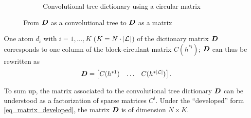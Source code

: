 \begin{figure}[!ht]
\begin{subfigure}[b]{0.69\textwidth}
\caption{Convolutional tree dictionary using a circular matrix}
\end{subfigure}
\caption{From $\bm{D}$ as a convolutional tree to $\bm{D}$ as a matrix}\label{fig_tree_as_matrix}
\end{figure}

One atom $d_i$ with $i = 1,\dots,K$ ($K=N \cdot |\mathcal L|$) of the dictionary matrix $\bm{D}$ corresponds to one column of the block-circulant matrix $C(h^{*l})$; $\bm{D}$ can thus be rewritten as
\begin{align}\bm{D} = \begin{bmatrix} C(h^{*1}) & \dots & C(h^{*{|\mathcal L|}}) \end{bmatrix}.\label{eq_matrix_factorized} \end{align}

To sum up, the matrix associated to the convolutional tree dictionary $\bm{D}$ can be understood as a factorization of sparse matrices $C^i$. Under the “developed” form \eqref{eq_matrix_developed}, the matrix $\bm{D}$ is of dimension $N \times K$.




\clearpage

